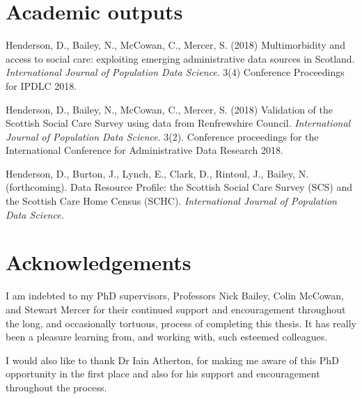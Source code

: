 \documentclass[12pt,a4paper,oneside,table]{report}
\begin{document}
\newpage
{}
\setcounter{tocdepth}{2}
\tableofcontents

\newpage
{}
\thispagestyle{empty}
\listoftables

\newpage
{}
\thispagestyle{empty}
\listoffigures

\newpage
\section*{Academic outputs}
\fancyhead[CO,CE]{}
\renewcommand{\headrulewidth}{0pt}

\thispagestyle{empty}

Henderson, D., Bailey, N., McCowan, C., Mercer, S. (2018) Multimorbidity
and access to social care: exploiting emerging administrative data
sources in Scotland.
\emph{International Journal of Population Data Science}. 3(4) Conference
Proceedings for IPDLC 2018.

Henderson, D., Bailey, N., McCowan, C., Mercer, S. (2018) Validation of
the Scottish Social Care Survey using data from Renfrewshire Council.
\emph{International Journal of Population Data Science}. 3(2).
Conference proceedings for the International Conference for
Administrative Data Research 2018.

Henderson, D., Burton, J., Lynch, E., Clark, D., Rintoul, J., Bailey, N.
(forthcoming). Data Resource Profile: the Scottish Social Care Survey
(SCS) and the Scottish Care Home Census (SCHC).
\emph{International Journal of Population Data Science}.

\newpage
\section*{Acknowledgements}
\fancyhead[CO,CE]{}
\renewcommand{\headrulewidth}{0pt}

\thispagestyle{empty}

I am indebted to my PhD supervisors, Professors Nick Bailey, Colin
McCowan, and Stewart Mercer for their continued support and
encouragement throughout the long, and occasionally tortuous, process of
completing this thesis. It has really been a pleasure learning from, and
working with, such esteemed colleagues.

I would also like to thank Dr Iain Atherton, for making me aware of this
PhD opportunity in the first place and also for his support and
encouragement throughout the process.
\end{document}
